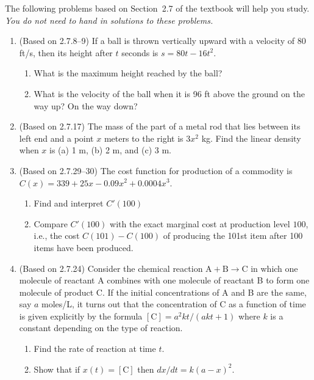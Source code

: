 \documentclass{article}
\title{\commonPSTitleZeroTwoSeven}
\author{\commonAuthor}
\date{\commonDateZeroTwoSeven}
\begin{document}
\maketitle
\thispagestyle{empty}

\noindent
The following problems based on Section~2.7 of the textbook will help
you study.  \emph{You do not need to hand in solutions to these
  problems.}
\begin{enumerate}
\item (Based on 2.7.8--9) %
  If a ball is thrown vertically upward with a velocity of 
  $80$ ft/s, then its height after $t$ seconds is $s=80t-16t^2$.
  \begin{enumerate}
  \item What is the maximum height reached by the ball?
  \item What is the velocity of the ball when it is 96 ft above
    the ground on the way up?  On the way down?
  \end{enumerate}
\item (Based on 2.7.17) %
  The mass of the part of a metal rod that lies between its left
  end and a point $x$ meters to the right is $3x^2$ kg.  Find the
  linear density when $x$ is (a) 1 m, (b) 2 m, and (c) 3 m.
\item (Based on 2.7.29--30) %
  The cost function for production of a commodity is
  $C(x)=339+25x-0.09x^2+0.0004x^3$.  
  \begin{enumerate}
  \item Find and interpret $C'(100)$
  \item Compare $C'(100)$ with the exact marginal cost at production
    level $100$, i.e., the cost $C(101)-C(100)$ of producing the
    101st item after 100 items have been produced.
  \end{enumerate}
\item (Based on 2.7.24) %
  Consider the chemical reaction $\mbox{A} + \mbox{B} \to \mbox{C}$ in
  which one molecule of reactant A combines with one molecule of 
  reactant B to form one molecule of product C.  If the initial
  concentrations of A and B are the same, say $a$ moles/L, it turns out
  that the concentration of C as a function of time is given explicitly
  by the formula $[\mbox{C}]=a^2kt/(akt+1)$ where $k$ is a constant
  depending on the type of reaction.
  \begin{enumerate}
  \item Find the rate of reaction at time $t$.
  \item Show that if $x(t)=[\mbox{C}]$ then $dx/dt = k(a-x)^2$.

\end{enumerate}
\end{enumerate}
\end{document}
